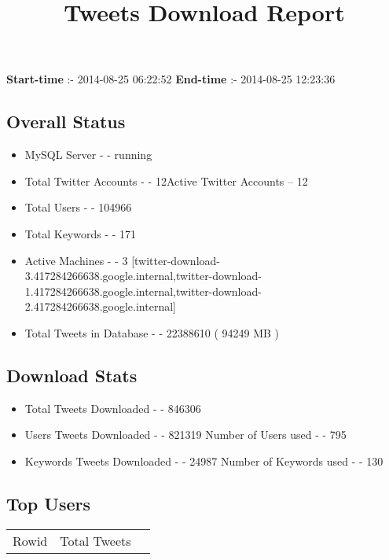 \documentclass{article}\usepackage[T1]{fontenc}
\begin{document}
\title{\textbf{Tweets Download Report}}
               \date{}
                \maketitle
               \centerline{\textbf{Start-time} :- 2014-08-25 06:22:52 \hspace{40pt} \textbf{End-time} :- 2014-08-25 12:23:36}               \subsection*{Overall Status}                \begin{itemize}                \item MySQL Server - - running               \item Total Twitter Accounts - - 12\newline Active Twitter Accounts -- 12               \item Total Users - - 104966               \item Total Keywords - - 171               \item Active Machines - - 3 [twitter-download-3.417284266638.google.internal,twitter-download-1.417284266638.google.internal,twitter-download-2.417284266638.google.internal]               \item Total Tweets in Database - - 22388610 ( 94249 MB )               \end{itemize}               \subsection*{Download Stats}                \begin{itemize}                \item Total Tweets Downloaded - - 846306               \item Users Tweets Downloaded - - 821319 \newline Number of Users used - - 795               \item Keywords Tweets Downloaded - - 24987 \newline Number of Keywords used - - 130              \end{itemize}              \subsection*{Top Users}\begin{tabular}{|c|c|c|}         \hline         Rowid & Total Tweets \\ 

\end{tabular}
\end{document}
